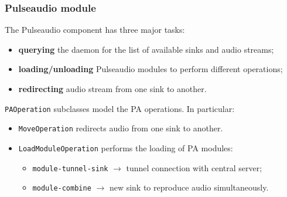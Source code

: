 \documentclass{beamer}
\begin{document}
	\begin{frame}
		\frametitle{Pulseaudio module}
		The Pulseaudio component has three major tasks:
		\begin{itemize}
		\item \textbf{querying} the daemon for the list of available sinks and audio streams;
		\item \textbf{loading/unloading} Pulseaudio modules to perform different operations;
		\item \textbf{redirecting} audio stream from one sink to another.
		\end{itemize}
		\texttt{PAOperation} subclasses model the PA operations. In particular: \\
		\begin{itemize}
		\item \texttt{MoveOperation} redirects audio from one sink to another.
		\item \texttt{LoadModuleOperation} performs the loading of PA modules:
			\begin{itemize}
			\item \texttt{module-tunnel-sink} $\rightarrow$ tunnel connection with central server;
			\item \texttt{module-combine} $\rightarrow$ new sink to reproduce audio simultaneously.
			\end{itemize}
		\end{itemize}

	\end{frame}
\end{document}
